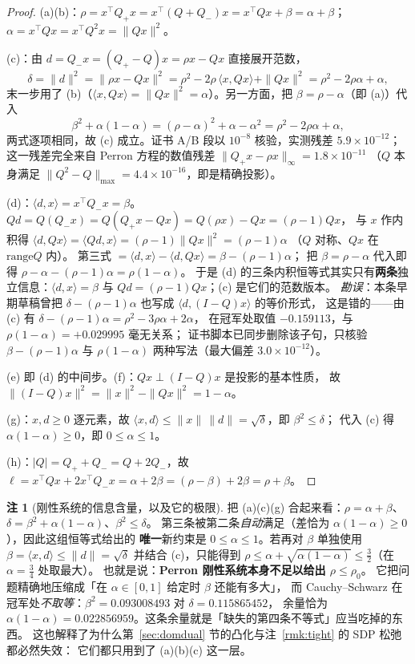 \documentclass[UTF8,11pt]{ctexart}
\theoremstyle{definition}
\newtheorem{remark}[theorem]{注}
\begin{document}
\begin{proof}
(a)(b)：$\rho=x^\top Q_+x=x^\top(Q+Q_-)x=x^\top Qx+\beta=\alpha+\beta$；
$\alpha=x^\top Qx=x^\top Q^2x=\|Qx\|^2$。

(c)：由 $d=Q_-x=(Q_+-Q)x=\rho x-Qx$ 直接展开范数，
\[
\delta=\|d\|^2=\|\rho x-Qx\|^2=\rho^2-2\rho\,\langle x,Qx\rangle+\|Qx\|^2
=\rho^2-2\rho\alpha+\alpha ,
\]
末一步用了 (b)（$\langle x,Qx\rangle=\|Qx\|^2=\alpha$）。另一方面，把 $\beta=\rho-\alpha$（即 (a)）代入
\[
\beta^2+\alpha(1-\alpha)=(\rho-\alpha)^2+\alpha-\alpha^2
=\rho^2-2\rho\alpha+\alpha ,
\]
两式逐项相同，故 (c) 成立。证书 A/B 段以 $10^{-8}$ 核验，实测残差 $5.9\times10^{-12}$；
这一残差完全来自 Perron 方程的数值残差 $\|Q_+x-\rho x\|_\infty=1.8\times10^{-11}$
（$Q$ 本身满足 $\|Q^2-Q\|_{\max}=4.4\times10^{-16}$，即是精确投影）。

(d)：$\langle d,x\rangle=x^\top Q_-x=\beta$。
$Qd=Q(Q_-x)=Q(Q_+x-Qx)=Q(\rho x)-Qx=(\rho-1)Qx$，
与 $x$ 作内积得 $\langle d,Qx\rangle=\langle Qd,x\rangle=(\rho-1)\|Qx\|^2=(\rho-1)\alpha$
（$Q$ 对称、$Qx$ 在 $\mathrm{range}Q$ 内）。
第三式 $=\langle d,x\rangle-\langle d,Qx\rangle=\beta-(\rho-1)\alpha$；
把 $\beta=\rho-\alpha$ 代入即得 $\rho-\alpha-(\rho-1)\alpha=\rho(1-\alpha)$。
于是 (d) 的三条内积恒等式其实只有\textbf{两条}独立信息：$\langle d,x\rangle=\beta$
与 $Qd=(\rho-1)Qx$；(c) 是它们的范数版本。
\emph{勘误}：本条早期草稿曾把 $\delta-(\rho-1)\alpha$ 也写成 $\langle d,(I-Q)x\rangle$ 的等价形式，
这是错的——由 (c) 有 $\delta-(\rho-1)\alpha=\rho^2-3\rho\alpha+2\alpha$，
在冠军处取值 $-0.159113$，与 $\rho(1-\alpha)=+0.029995$ 毫无关系；
证书脚本已同步删除该子句，只核验 $\beta-(\rho-1)\alpha$ 与 $\rho(1-\alpha)$ 两种写法（最大偏差 $3.0\times10^{-12}$）。

(e) 即 (d) 的中间步。(f)：$Qx\perp(I-Q)x$ 是投影的基本性质，
故 $\|(I-Q)x\|^2=\|x\|^2-\|Qx\|^2=1-\alpha$。

(g)：$x,d\ge0$ 逐元素，故 $\langle x,d\rangle\le\|x\|\,\|d\|=\sqrt\delta$，即 $\beta^2\le\delta$；
代入 (c) 得 $\alpha(1-\alpha)\ge0$，即 $0\le\alpha\le1$。

(h)：$|Q|=Q_++Q_-=Q+2Q_-$，故 $\ell=x^\top Qx+2x^\top Q_-x=\alpha+2\beta=(\rho-\beta)+2\beta=\rho+\beta$。\qedhere
\end{proof}

\begin{remark}[刚性系统的信息含量，以及它的极限]\label{rmk:rigiditylimit}
把 (a)(c)(g) 合起来看：$\rho=\alpha+\beta$、$\delta=\beta^2+\alpha(1-\alpha)$、$\beta^2\le\delta$。
第三条被第二条\emph{自动}满足（差恰为 $\alpha(1-\alpha)\ge0$），因此这组恒等式给出的
\textbf{唯一}新约束是 $0\le\alpha\le1$。若再对 $\beta$ 单独使用 $\beta=\langle x,d\rangle\le\|d\|=\sqrt\delta$
并结合 (c)，只能得到 $\rho\le\alpha+\sqrt{\alpha(1-\alpha)}\le\frac32$（在 $\alpha=\frac34$ 处取最大）。
也就是说：\textbf{Perron 刚性系统本身不足以给出 $\rho\le\rho_0$}。
它把问题精确地压缩成「在 $\alpha\in[0,1]$ 给定时 $\beta$ 还能有多大」，
而 Cauchy--Schwarz 在冠军处\emph{不取等}：$\beta^2=0.093008493$ 对 $\delta=0.115865452$，
余量恰为 $\alpha(1-\alpha)=0.022856959$。这条余量就是「缺失的第四条不等式」应当吃掉的东西。
这也解释了为什么第~\ref{sec:domdual} 节的凸化与注~\ref{rmk:tight} 的 SDP 松弛都必然失效：
它们都只用到了 (a)(b)(c) 这一层。
\end{remark}
\end{document}
